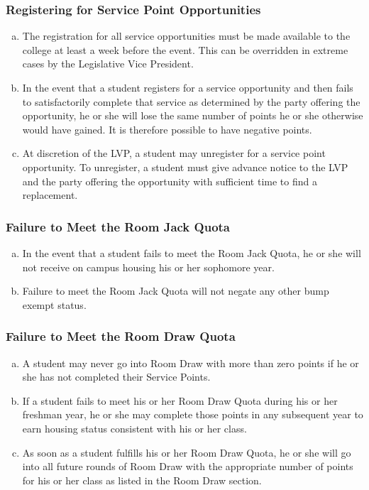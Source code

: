 \documentclass[USletter,12pt]{article}
\begin{document}
\subsubsection{Registering for Service Point Opportunities}
\begin{enumerate}[(a)]
\item The registration for all service opportunities must be made available to the college at least a week before the event.  This can be overridden in extreme cases by the Legislative Vice President.
\item In the event that a student registers for a service opportunity and then fails to satisfactorily complete that service as determined by the party offering the opportunity, he or she will lose the same number of points he or she otherwise would have gained.  It is therefore possible to have negative points.
\item At discretion of the LVP, a student may unregister for a service point opportunity.  To unregister, a student must give advance notice to the LVP and the party offering the opportunity with sufficient time to find a replacement.
\end{enumerate}

\subsubsection{Failure to Meet the Room Jack Quota}
\begin{enumerate}[(a)]
\item In the event that a student fails to meet the Room Jack Quota, he or she will not receive on campus housing his or her sophomore year.
\item Failure to meet the Room Jack Quota will not negate any other bump exempt status.
\end{enumerate}

\subsubsection{Failure to Meet the Room Draw Quota}
\begin{enumerate}[(a)]
\item A student may never go into Room Draw with more than zero points if he or she has not completed their Service Points.
\item If a student fails to meet his or her Room Draw Quota during his or her freshman year, he or she may complete those points in any subsequent year to earn housing status consistent with his or her class.
\item As soon as a student fulfills his or her Room Draw Quota, he or she will go into all future rounds of Room Draw with the appropriate number of points for his or her class as listed in the Room Draw section.
\end{enumerate}
\end{document}
